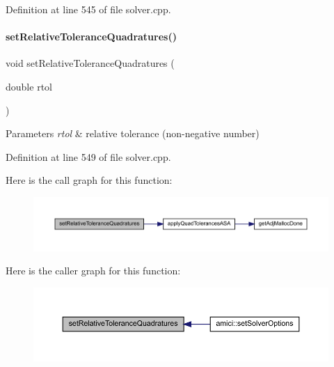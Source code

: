 Definition at line 545 of file solver.\+cpp.

\mbox{\label{classamici_1_1_solver_a086428d30274f2b7e6f94e8e7593dd8b}} 
\paragraph{\texorpdfstring{set\+Relative\+Tolerance\+Quadratures()}{setRelativeToleranceQuadratures()}}
{\footnotesize\ttfamily void set\+Relative\+Tolerance\+Quadratures (\begin{DoxyParamCaption}\item[{double}]{rtol }\end{DoxyParamCaption})}


\begin{DoxyParams}{Parameters}
{\em rtol} & relative tolerance (non-\/negative number) \\
\hline
\end{DoxyParams}


Definition at line 549 of file solver.\+cpp.

Here is the call graph for this function\+:
\nopagebreak
\begin{figure}[H]
\begin{center}
\leavevmode
\includegraphics[width=350pt]{classamici_1_1_solver_a086428d30274f2b7e6f94e8e7593dd8b_cgraph}
\end{center}
\end{figure}
Here is the caller graph for this function\+:
\nopagebreak
\begin{figure}[H]
\begin{center}
\leavevmode
\includegraphics[width=350pt]{classamici_1_1_solver_a086428d30274f2b7e6f94e8e7593dd8b_icgraph}
\end{center}
\end{figure}
\mbox{\label{classamici_1_1_solver_a1f50a4e21784c2757530068483c405cb}} 
